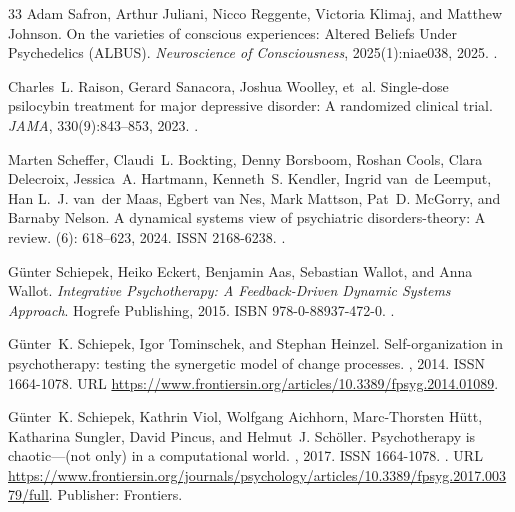 \documentclass[12pt,fleqn]{article}
\begin{document}
\begin{thebibliography}{33}
  Adam Safron, Arthur Juliani, Nicco Reggente, Victoria Klimaj, and Matthew Johnson.
  \newblock On the varieties of conscious experiences: Altered Beliefs Under
  Psychedelics (ALBUS).
  \newblock \emph{Neuroscience of Consciousness}, 2025(1):niae038, 2025.
  \newblock {}.

  Charles~L. Raison, Gerard Sanacora, Joshua Woolley, et~al.
  \newblock Single-dose psilocybin treatment for major depressive disorder:
  A randomized clinical trial.
  \newblock \emph{JAMA}, 330(9):843--853, 2023.
  \newblock {}.

  Marten Scheffer, Claudi~L. Bockting, Denny Borsboom, Roshan Cools, Clara
  Delecroix, Jessica~A. Hartmann, Kenneth~S. Kendler, Ingrid van~de Leemput,
  Han L.~J. van~der Maas, Egbert van Nes, Mark Mattson, Pat~D. {McGorry}, and
  Barnaby Nelson.
  \newblock A dynamical systems view of psychiatric disorders-theory: A review.
   (6): 618--623, 2024.
  \newblock ISSN 2168-6238.
  \newblock {}.

  G\"unter Schiepek, Heiko Eckert, Benjamin Aas, Sebastian Wallot, and Anna
  Wallot.
  \newblock \emph{Integrative Psychotherapy: A Feedback-Driven Dynamic Systems
    Approach}.
  \newblock Hogrefe Publishing, 2015.
  \newblock ISBN 978-0-88937-472-0.
  \newblock {}.

  G\"unter~K. Schiepek, Igor Tominschek, and Stephan Heinzel.
  \newblock Self-organization in psychotherapy: testing the synergetic model of
  change processes.
  , 2014.
  \newblock ISSN 1664-1078.
  \newblock URL
  \url{https://www.frontiersin.org/articles/10.3389/fpsyg.2014.01089}.

  G\"unter~K. Schiepek, Kathrin Viol, Wolfgang Aichhorn, Marc-Thorsten H\"utt,
  Katharina Sungler, David Pincus, and Helmut~J. Sch\"oller.
  \newblock Psychotherapy is chaotic---(not only) in a computational world.
  , 2017.
  \newblock ISSN 1664-1078.
  \newblock {}.
  \newblock URL
  \url{https://www.frontiersin.org/journals/psychology/articles/10.3389/fpsyg.2017.00379/full}.
  \newblock Publisher: Frontiers.


\end{thebibliography}
\end{document}
